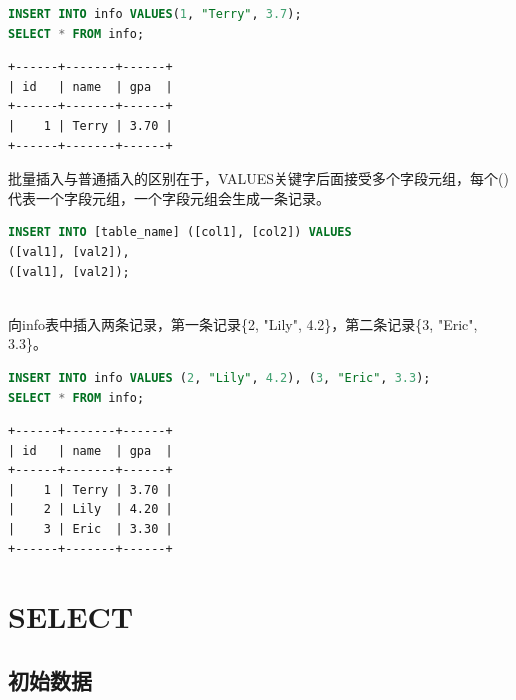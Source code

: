 \documentclass[12pt, openany, oneside]{book}
\begin{document}
\begin{lstlisting}[language=SQL]
INSERT INTO info VALUES(1, "Terry", 3.7);
SELECT * FROM info;
\end{lstlisting}

\begin{tcolorbox}
    \begin{verbatim}
+------+-------+------+
| id   | name  | gpa  |
+------+-------+------+
|    1 | Terry | 3.70 |
+------+-------+------+
    \end{verbatim}
\end{tcolorbox}

批量插入与普通插入的区别在于，VALUES关键字后面接受多个字段元组，每个()代表一个字段元组，一个字段元组会生成一条记录。

\vspace{-0.5cm}

\begin{lstlisting}[language=SQL]
INSERT INTO [table_name] ([col1], [col2]) VALUES
([val1], [val2]),
([val1], [val2]);
\end{lstlisting}

\vspace{0.5cm}

 \\

向info表中插入两条记录，第一条记录\{2, "Lily", 4.2\}，第二条记录\{3, "Eric", 3.3\}。

\vspace{-0.5cm}

\begin{lstlisting}[language=SQL]
INSERT INTO info VALUES (2, "Lily", 4.2), (3, "Eric", 3.3);
SELECT * FROM info;
\end{lstlisting}

\begin{tcolorbox}
    \begin{verbatim}
+------+-------+------+
| id   | name  | gpa  |
+------+-------+------+
|    1 | Terry | 3.70 |
|    2 | Lily  | 4.20 |
|    3 | Eric  | 3.30 |
+------+-------+------+
    \end{verbatim}
\end{tcolorbox}

\newpage

\chapter{SELECT}

\section{初始数据}
\end{document}
